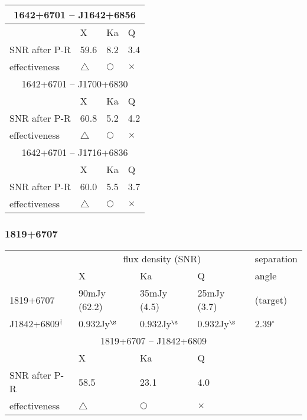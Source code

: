 \begin{tabular}{p{30mm}|p{30mm}|p{30mm}|p{30mm}|p{20mm}}
\hline
\hline
\multicolumn{5}{c}{1642+6701 -- J1642+6856}         \\
\hline
              &  X          & Ka         & \multicolumn{2}{l}{Q}       \\
\hline
SNR after P-R & 59.6        &  8.2       & \multicolumn{2}{l}{3.4}     \\
\hline
effectiveness & $\triangle$ & $\bigcirc$ & \multicolumn{2}{l}{$\times$}\\
\hline
\hline
\multicolumn{5}{c}{1642+6701 -- J1700+6830}         \\
\hline
              &  X          & Ka         & \multicolumn{2}{l}{Q}       \\
\hline
SNR after P-R & 60.8        & 5.2        & \multicolumn{2}{l}{4.2}     \\
\hline
effectiveness & $\triangle$ & $\bigcirc$ & \multicolumn{2}{l}{$\times$}\\
\hline
\hline
\multicolumn{5}{c}{1642+6701 -- J1716+6836}         \\
\hline
              &  X          & Ka         & \multicolumn{2}{l}{Q}       \\
\hline
SNR after P-R & 60.0        & 5.5        & \multicolumn{2}{l}{3.7}     \\
\hline
effectiveness & $\triangle$ & $\bigcirc$ & \multicolumn{2}{l}{$\times$}\\
\hline
\end{tabular}

\subsubsection{
  1819+6707
}
\begin{tabular}{p{30mm}|p{30mm}|p{30mm}|p{30mm}|p{20mm}}
\hline
                 & \multicolumn{3}{c|}{flux density (SNR)}
                 & separation \\
\cline{2-4}
                 & X
                 & Ka
                 & Q
                 & angle \\
\hline
1819+6707        &  90mJy (62.2)
                 &  35mJy (4.5)
                 &  25mJy (3.7)
                 & (target)   \\
\hline
J1842+6809$^\dag$& 0.932Jy$^\S$
                 & 0.932Jy$^\S$
                 & 0.932Jy$^\S$
                 & 2.39$^\circ$ \\
\hline
\hline
\multicolumn{5}{c}{1819+6707 -- J1842+6809}         \\
\hline
              &  X          & Ka         & \multicolumn{2}{l}{Q}       \\
\hline
SNR after P-R & 58.5        & 23.1       & \multicolumn{2}{l}{4.0}     \\
\hline
effectiveness & $\triangle$ & $\bigcirc$ & \multicolumn{2}{l}{$\times$}\\
\hline
\end{tabular}

